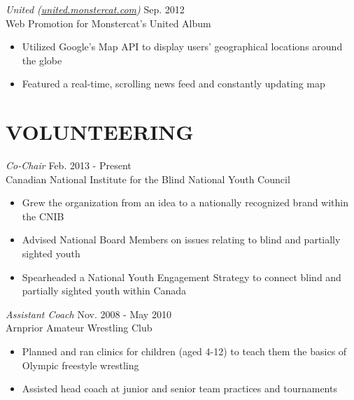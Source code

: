 \documentclass[margin]{res}
\begin{document}
\begin{resume}
{\sl United (\href{http://united.monstercat.com}{united.monstercat.com}) } \hfill Sep. 2012 \\
Web Promotion for Monstercat's United Album
\begin{itemize} \itemsep -2pt
  \item Utilized Google's Map API to display users' geographical locations around the globe
  \item Featured a real-time, scrolling news feed and constantly updating map
\end{itemize}

\section{VOLUNTEERING}
{\sl Co-Chair} \hfill Feb. 2013 - Present\\
Canadian National Institute for the Blind National Youth Council
\begin{itemize} \itemsep -2pt
	\item Grew the organization from an idea to a nationally recognized brand within the CNIB
	\item Advised National Board Members on issues relating to blind and partially sighted youth
  \item Spearheaded a National Youth Engagement Strategy to connect blind and partially sighted youth within Canada
\end{itemize}

{\sl Assistant Coach} \hfill Nov. 2008 - May 2010\\
Arnprior Amateur Wrestling Club
\begin{itemize}\itemsep -2pt
  \item Planned and ran clinics for children (aged 4-12) to teach them the basics of Olympic freestyle wrestling
  \item Assisted head coach at junior and senior team practices and tournaments
\end{itemize}

\end{resume}
\end{document}
